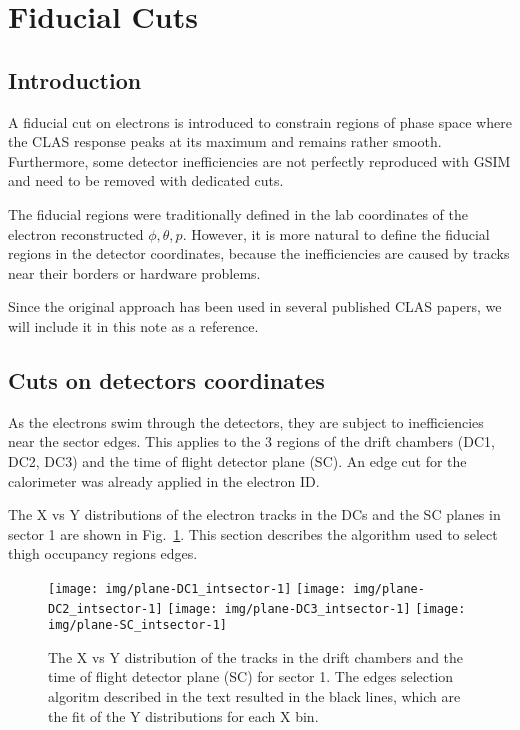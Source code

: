 \section{Fiducial Cuts}

\subsection{Introduction}

A fiducial cut on electrons is introduced to constrain regions of phase space
where the CLAS response peaks at its maximum and remains rather smooth.
Furthermore, some detector inefficiencies are not perfectly reproduced with GSIM and need to be
removed with dedicated cuts.

The fiducial regions were traditionally defined in the lab coordinates of the electron reconstructed $\phi, \theta, p$.
However, it is more natural to define the fiducial regions in the detector coordinates, because
the inefficiencies are caused by tracks near their borders or hardware problems.

Since the original approach has been used in several published CLAS papers, we will include it in this note
as a reference.



\subsection{Cuts on detectors coordinates}

As the electrons swim through the detectors, they are subject to inefficiencies near the sector edges.
This applies to the 3 regions of the drift chambers (DC1, DC2, DC3) and the time of flight detector plane (SC).
An edge cut for the calorimeter was already applied in the electron ID\@.

\newpage

The X vs Y distributions of the electron tracks in the DCs and the SC planes in sector 1 are shown in Fig.~\ref{fig:xy_all_planes_s1}.
This section describes the algorithm used to select thigh occupancy regions edges.

\begin{figure}[h]
    \centering
    \texttt{[image: img/plane-DC1\_intsector-1]}
    \texttt{[image: img/plane-DC2\_intsector-1]}
    \texttt{[image: img/plane-DC3\_intsector-1]}
    \texttt{[image: img/plane-SC\_intsector-1]}
    \caption{The X vs Y distribution of the tracks in the drift chambers and the time
    of flight detector plane (SC) for sector 1. The edges selection algoritm described in the text resulted
    in the black lines, which are the fit of the Y distributions for each X bin.}
    \label{fig:xy_all_planes_s1}
\end{figure}

